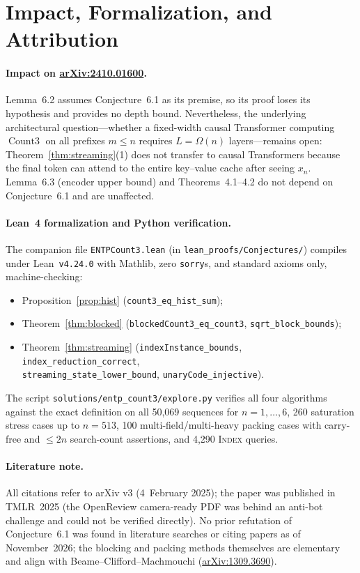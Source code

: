 \documentclass[11pt]{article}
\theoremstyle{plain}
\theoremstyle{definition}
\theoremstyle{remark}
\DeclareMathOperator{\CountThree}{Count3}
\begin{document}
\section{Impact, Formalization, and Attribution}

\paragraph{Impact on \href{https://arxiv.org/abs/2410.01600}{arXiv:2410.01600}.}
Lemma~6.2 assumes Conjecture~6.1 as its premise, so its proof loses its hypothesis and provides no depth bound.
Nevertheless, the underlying architectural question---whether a fixed-width causal Transformer computing $\CountThree$ on all prefixes $m \le n$ requires $L = \Omega(n)$ layers---remains open: Theorem~\ref{thm:streaming}(1) does not transfer to causal Transformers because the final token can attend to the entire key--value cache after seeing $x_n$.
Lemma~6.3 (encoder upper bound) and Theorems~4.1--4.2 do not depend on Conjecture~6.1 and are unaffected.

\paragraph{Lean~4 formalization and Python verification.}
The companion file \texttt{ENTPCount3.lean} (in \texttt{lean\_proofs/Conjectures/}) compiles under Lean~\texttt{v4.24.0} with Mathlib, zero \texttt{sorry}s, and standard axioms only, machine-checking:
\begin{itemize}[leftmargin=2em,itemsep=1pt,topsep=3pt]
\item Proposition~\ref{prop:hist} (\texttt{count3\_eq\_hist\_sum});
\item Theorem~\ref{thm:blocked} (\texttt{blockedCount3\_eq\_count3}, \texttt{sqrt\_block\_bounds});
\item Theorem~\ref{thm:streaming} (\texttt{indexInstance\_bounds}, \texttt{index\_reduction\_correct},\\
\texttt{streaming\_state\_lower\_bound}, \texttt{unaryCode\_injective}).
\end{itemize}
The script \texttt{solutions/entp\_count3/explore.py} verifies all four algorithms against the exact definition on all 50,069 sequences for $n = 1, \dots, 6$, 260 saturation stress cases up to $n = 513$, 100 multi-field/multi-heavy packing cases with carry-free and $\le 2n$ search-count assertions, and 4,290 \textsc{Index} queries.

\paragraph{Literature note.}
All citations refer to arXiv v3 (4~February 2025); the paper was published in TMLR~2025 (the OpenReview camera-ready PDF was behind an anti-bot challenge and could not be verified directly). No prior refutation of Conjecture~6.1 was found in literature searches or citing papers as of November~2026; the blocking and packing methods themselves are elementary and align with Beame--Clifford--Machmouchi (\href{https://arxiv.org/abs/1309.3690}{arXiv:1309.3690}).
\end{document}
